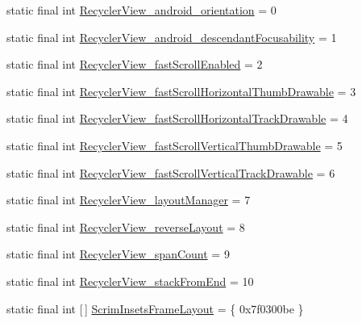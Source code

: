 \begin{DoxyCompactItemize}
\item 
static final int \mbox{\hyperlink{classandroid_1_1support_1_1design_1_1_r_1_1styleable_ab9390b378dd6563d22143690901058f6}{Recycler\+View\+\_\+android\+\_\+orientation}} = 0
\item 
static final int \mbox{\hyperlink{classandroid_1_1support_1_1design_1_1_r_1_1styleable_a448c8a9d6df9b29107ef83d38ea7b81b}{Recycler\+View\+\_\+android\+\_\+descendant\+Focusability}} = 1
\item 
static final int \mbox{\hyperlink{classandroid_1_1support_1_1design_1_1_r_1_1styleable_acd05409ffd4040301dbbc135f7d68ca7}{Recycler\+View\+\_\+fast\+Scroll\+Enabled}} = 2
\item 
static final int \mbox{\hyperlink{classandroid_1_1support_1_1design_1_1_r_1_1styleable_a428b728acd01942475bedd6c720b7074}{Recycler\+View\+\_\+fast\+Scroll\+Horizontal\+Thumb\+Drawable}} = 3
\item 
static final int \mbox{\hyperlink{classandroid_1_1support_1_1design_1_1_r_1_1styleable_a07b39048d492e02cb1c131ece9143f57}{Recycler\+View\+\_\+fast\+Scroll\+Horizontal\+Track\+Drawable}} = 4
\item 
static final int \mbox{\hyperlink{classandroid_1_1support_1_1design_1_1_r_1_1styleable_af8b09c77a7b099e58b5fee50f2646753}{Recycler\+View\+\_\+fast\+Scroll\+Vertical\+Thumb\+Drawable}} = 5
\item 
static final int \mbox{\hyperlink{classandroid_1_1support_1_1design_1_1_r_1_1styleable_a92c824253385475c40f5c93eb764e927}{Recycler\+View\+\_\+fast\+Scroll\+Vertical\+Track\+Drawable}} = 6
\item 
static final int \mbox{\hyperlink{classandroid_1_1support_1_1design_1_1_r_1_1styleable_a675eed992758f2eceac3fc80f1ad3d85}{Recycler\+View\+\_\+layout\+Manager}} = 7
\item 
static final int \mbox{\hyperlink{classandroid_1_1support_1_1design_1_1_r_1_1styleable_a09adeaf62a2a8f15978354fe728e2b7b}{Recycler\+View\+\_\+reverse\+Layout}} = 8
\item 
static final int \mbox{\hyperlink{classandroid_1_1support_1_1design_1_1_r_1_1styleable_a24f02c9840efea0629dcb5d306a55600}{Recycler\+View\+\_\+span\+Count}} = 9
\item 
static final int \mbox{\hyperlink{classandroid_1_1support_1_1design_1_1_r_1_1styleable_a1442d68f0c2f2be32bfea74e239de55e}{Recycler\+View\+\_\+stack\+From\+End}} = 10
\item 
static final int \mbox{[}$\,$\mbox{]} \mbox{\hyperlink{classandroid_1_1support_1_1design_1_1_r_1_1styleable_a95b90e25d1cb72b4321bb1e78f92f75b}{Scrim\+Insets\+Frame\+Layout}} = \{ 0x7f0300be \}

\end{DoxyCompactItemize}
